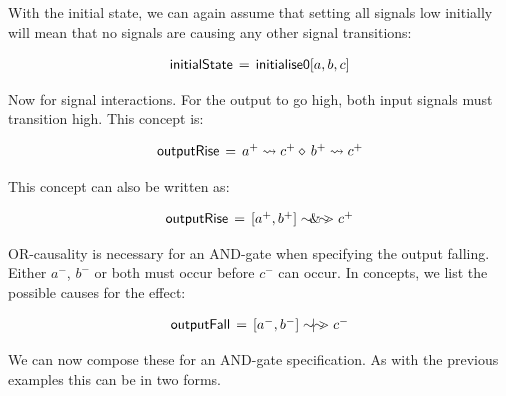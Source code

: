 \documentclass[british,conference,compsoc]{IEEEtran}
\begin{document}
\noindent With the initial state, we can again assume that setting all signals low initially will mean 
that no signals are causing any other signal transitions:

\[
\begin{array}{lcl}
\mathsf{initialState}&\hspace{-2mm}=&\hspace{-2mm}\mathsf{initialise0} [a, b, c]
\end{array}
\]

\noindent Now for signal interactions. For the output to go high, both input signals must
transition high. This concept is: 

\[
\begin{array}{lcl}
\mathsf{outputRise}&\hspace{-2mm}=&\hspace{-2mm}a^{+} \rightsquigarrow c^{+} \diamond\, b^{+} \rightsquigarrow c^{+}
\end{array}
\]

\noindent This concept can also be written as:

\[
\begin{array}{lcl}
\mathsf{outputRise}&\hspace{-2mm}=&\hspace{-2mm}[a^{+}, b^{+}] \sim\hspace{-1.5mm}\&\hspace{-1.5mm}\sim\hspace{-1.5mm}> c^{+} 
\end{array}
\]

\noindent OR-causality is necessary for an AND-gate when specifying the output falling. Either $a^{-}$,
$b^{-}$ or both must occur before $c^{-}$ can occur. In concepts, we list the possible
causes for the effect:

\[
\begin{array}{lcl}
\mathsf{outputFall}&\hspace{-2mm}=&\hspace{-2mm}[a^{-}, b^{-}] \sim\hspace{-1.5mm}|\hspace{-1.5mm}\sim\hspace{-1.5mm}> c^{-} 
\end{array}
\]

\noindent We can now compose these for an AND-gate specification. As with the previous examples
this can be in two forms.
\end{document}
